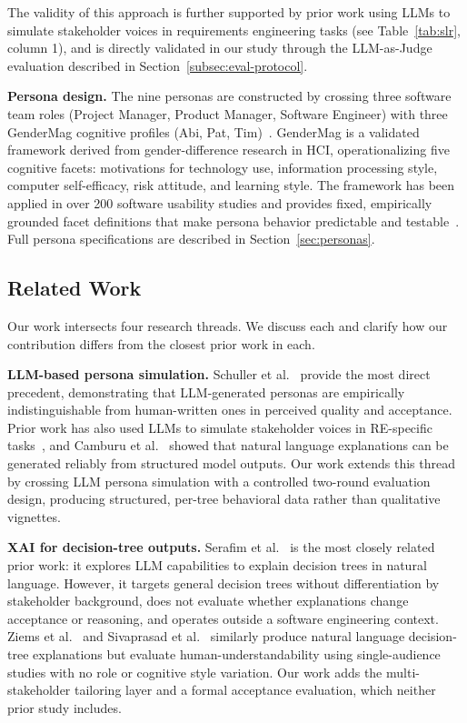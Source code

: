 \documentclass[sigconf,review]{acmart}
\begin{document}
The validity of this approach is further supported by prior work using
LLMs to simulate stakeholder voices in requirements engineering tasks
(see Table~\ref{tab:slr}, column 1), and is directly validated in our
study through the LLM-as-Judge evaluation described in
Section~\ref{subsec:eval-protocol}.

\textbf{Persona design.} The nine personas are constructed by crossing
three software team roles (Project Manager, Product Manager, Software
Engineer) with three GenderMag cognitive profiles (Abi, Pat,
Tim)~\cite{burnett2016gendermag}. GenderMag is a validated framework
derived from gender-difference research in HCI, operationalizing five
cognitive facets: motivations for technology use, information processing
style, computer self-efficacy, risk attitude, and learning style. The
framework has been applied in over 200 software usability studies and
provides fixed, empirically grounded facet definitions that make
persona behavior predictable and testable~\cite{burnett2016gendermag,
mendez2019inclusivemag}. Full persona specifications are described in
Section~\ref{sec:personas}.

\subsection{Related Work}
\label{subsec:related-work}

Our work intersects four research threads. We discuss each and clarify
how our contribution differs from the closest prior work in each.

\textbf{LLM-based persona simulation.}
Schuller et al.~\cite{schuller2024generating} provide the most direct
precedent, demonstrating that LLM-generated personas are empirically
indistinguishable from human-written ones in perceived quality and
acceptance. Prior work has also used LLMs to simulate stakeholder voices
in RE-specific tasks~\cite{arora2024advancing, zadenoori2025large}, and
Camburu et al.~\cite{camburu2018snli} showed that natural language
explanations can be generated reliably from structured model outputs.
Our work extends this thread by crossing LLM persona simulation with a
controlled two-round evaluation design, producing structured, per-tree
behavioral data rather than qualitative vignettes.

\textbf{XAI for decision-tree outputs.}
Serafim et al.~\cite{serafim2024exploring} is the most closely related
prior work: it explores LLM capabilities to explain decision trees in
natural language. However, it targets general decision trees without
differentiation by stakeholder background, does not evaluate whether
explanations change acceptance or reasoning, and operates outside a
software engineering context. Ziems et al.~\cite{ziems2023explaining}
and Sivaprasad et al.~\cite{sivaprasad2023evaluation} similarly produce
natural language decision-tree explanations but evaluate
human-understandability using single-audience studies with no role or
cognitive style variation. Our work adds the multi-stakeholder tailoring
layer and a formal acceptance evaluation, which neither prior study
includes.
\end{document}
